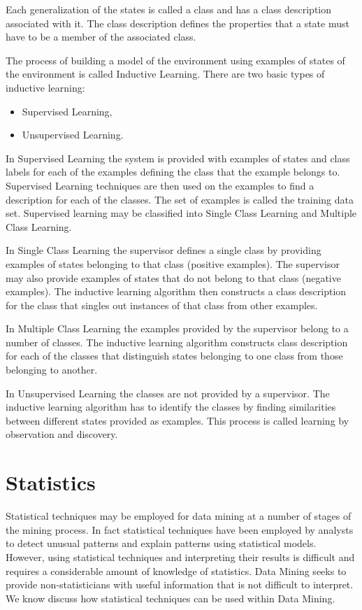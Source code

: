 \documentclass[a4paper,12pt,notitlepage,pdftex]{scrreprt}
\begin{document}
            Each generalization of the states is called a class and has a class description associated with it.
            The class description defines the properties that a state must have to be a member of the associated
            class.

            The process of building a model of the environment using examples of states of the environment is called
            Inductive Learning.
            There are two basic types of inductive learning:
            \begin{itemize}
                \item Supervised Learning,
                \item Unsupervised Learning.
            \end{itemize}

            In Supervised Learning the system is provided with examples of states and class labels for each of the
            examples defining the class that the example belongs to.
            Supervised Learning techniques are then used on the examples to find a description for each of the
            classes.
            The set of examples is called the training data set.
            Supervised learning may be classified into Single Class Learning and Multiple Class Learning.

            In Single Class Learning the supervisor defines a single class by providing examples of states belonging
            to that class (positive examples).
            The supervisor may also provide examples of states that do not belong to that class (negative examples).
            The inductive learning algorithm then constructs a class description for the class that singles out
            instances of that class from other examples.

            In Multiple Class Learning the examples provided by the supervisor belong to a number of classes.
            The inductive learning algorithm constructs class description for each of the classes that distinguish
            states belonging to one class from those belonging to another.

            In Unsupervised Learning the classes are not provided by a supervisor.
            The inductive learning algorithm has to identify the classes by finding similarities between different
            states provided as examples.
            This process is called learning by observation and discovery.

    \section{Statistics}
        Statistical techniques may be employed for data mining at a number of stages of the mining process.
        In fact statistical techniques have been employed by analysts to detect unusual patterns and explain patterns using statistical models.
        However, using statistical techniques and interpreting their results is difficult and requires a considerable amount of knowledge of statistics.
        Data Mining seeks to provide non-statisticians with useful information that is not difficult to interpret.
        We know discuss how statistical techniques can be used within Data Mining.
\end{document}

